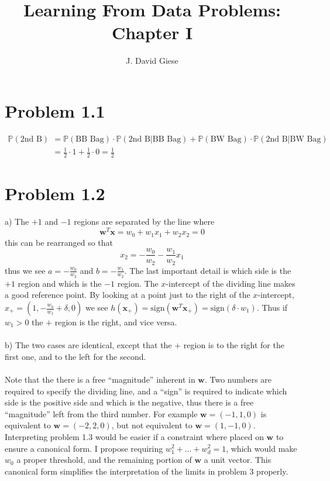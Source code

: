 \documentclass[11pt,letterpaper]{article}
\title{Learning From Data Problems: Chapter I}
\date{}
\author{J. David Giese}
\newcommand{\sign}[0]{\textrm{sign}}
\newcommand{\vv}[1]{\mathbf{#1}} %
\newcommand{\p}[0]{\mathbb{P}}
\begin{document}
\maketitle

\section*{Problem 1.1}
\begin{align*}
    \p(\textrm{2nd B}) &=
    \p(\textrm{BB Bag}) \cdot \p(\textrm{2nd B}|\textrm{BB Bag}) + \p(\textrm{BW Bag}) \cdot \p(\textrm{2nd B}|\textrm{BW Bag}) \\
    &= \frac{1}{2}\cdot 1 + \frac{1}{2} \cdot 0 = \frac{1}{2}
\end{align*}

\section*{Problem 1.2}
a) The $+1$ and $-1$ regions are separated by the line where 
\begin{equation*}
    \vv{w}^T\vv{x} = w_0 + w_1 x_1 + w_2 x_2 = 0
\end{equation*}
this can be rearranged so that
\begin{equation*}
    x_2 = -\frac{w_0}{w_2} - \frac{w_1}{w_2}x_1
\end{equation*}
thus we see $a = -\frac{w_0}{w_2}$ and $b = -\frac{w_1}{w_2}$.  The last important detail is which side is the $+1$ region and which is the $-1$ region.  The $x$-intercept of the dividing line makes a good reference point.  By looking at a point just to the right of the $x$-intercept, $x_+ = (1, -\frac{w_0}{w_1} + \delta, 0)$ we see $h(\vv{x_+}) = \sign(\vv{w}^T \vv{x_+}) = \sign(\delta \cdot w_1)$.  Thus if $w_1 > 0$ the $+$ region is the right, and vice versa. \\\\
b) The two cases are identical, except that the $+$ region is to the right for the first one, and to the left for the second.  \\\\
Note that the there is a free ``magnitude'' inherent in $\vv{w}$.  Two numbers are required to specify the dividing line, and a ``sign'' is required to indicate which side is the positive side and which is the negative, thus there is a free ``magnitude'' left from the third number.  For example $\vv{w} = (-1, 1, 0)$ is equivalent to $\vv{w} = (-2, 2, 0)$, but not equivalent to $\vv{w} = (1, -1, 0)$.  Interpreting problem 1.3 would be easier if a constraint where placed on $\vv{w}$ to ensure a canonical form.  I propose requiring $w_1^2 + ... + w_d^2 = 1$, which would make $w_0$ a proper threshold, and the remaining portion of $\vv{w}$ a unit vector.  This canonical form simplifies the interpretation of the limits in problem 3 properly.
\end{document}
